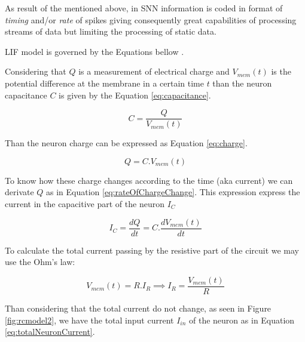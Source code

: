 		\par As result of the mentioned above, in SNN information is coded in format of \textit{timing} and/or \textit{rate} of spikes giving consequently great capabilities of processing streams of data but limiting the processing of static data.\newline
		
		\par LIF model is governed by the Equations bellow \cite{10242251}.
		
		
		\par Considering that $Q$ is a measurement of electrical charge and $V_{mem}(t)$ is the potential difference at the membrane in a certain time $t$ than the neuron capacitance $C$ is given by the Equation \ref{eq:capacitance}.
		
		\begin{equation}
			\label{eq:capacitance}
			C = \frac{Q}{V_{mem}(t)}
		\end{equation}
		
		\par Than the neuron charge can be expressed as Equation \ref{eq:charge}.
		
		\begin{equation}
			\label{eq:charge}
			Q = C.V_{mem}(t)
		\end{equation}
		
		\par To know how these charge changes according to the time (aka current) we can derivate $Q$ as in Equation \ref{eq:rateOfChargeChange}. This expression express the current in the capacitive part of the neuron $I_C$
		
		\begin{equation}
			\label{eq:rateOfChargeChange}
			I_C = \dfrac{dQ}{dt} = C. \dfrac{dV_{mem}(t)}{dt}
		\end{equation}
		
		
		\par To calculate the total current passing by the resistive part of the circuit we may use the Ohm's law:
		
		\begin{equation}
			\label{eq:ohmlaw}
			V_{mem}(t) = R.I_R \implies I_R = \frac{V_{mem}(t)}{R}
		\end{equation}
		
		\par Than considering that the total current do not change, as seen in Figure \ref{fig:rcmodel2}, we have the total input current $I_{in}$ of the neuron as in Equation \ref{eq:totalNeuronCurrent}.
		
